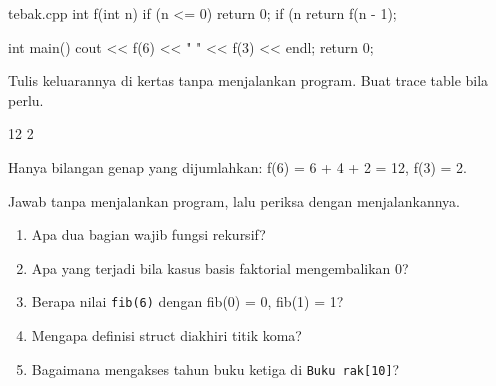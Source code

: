 \documentclass[a4paper]{article}
\begin{document}
\begin{MKode}{tebak.cpp}
int f(int n) {
    if (n <= 0) return 0;
    if (n %
    return f(n - 1);
}

int main() {
    cout << f(6) << " " << f(3) << endl;
    return 0;
}
\end{MKode}
\begin{Tebak}[]
Tulis keluarannya di kertas tanpa menjalankan program. Buat trace table bila perlu.
\end{Tebak}
\begin{Jawaban}[]
\begin{MKeluaran}[]
12 2
\end{MKeluaran}
Hanya bilangan genap yang dijumlahkan: f(6) = 6 + 4 + 2 = 12, f(3) = 2.
\end{Jawaban}
\par\vspace{4pt}\par\vspace{6pt}
Jawab tanpa menjalankan program, lalu periksa dengan menjalankannya.
\begin{enumerate}
\item Apa dua bagian wajib fungsi rekursif?
\item Apa yang terjadi bila kasus basis faktorial mengembalikan 0?
\item Berapa nilai \texttt{fib(6)} dengan fib(0) = 0, fib(1) = 1?
\item Mengapa definisi struct diakhiri titik koma?
\item Bagaimana mengakses tahun buku ketiga di \texttt{Buku rak[10]}?
\end{enumerate}
\end{document}
